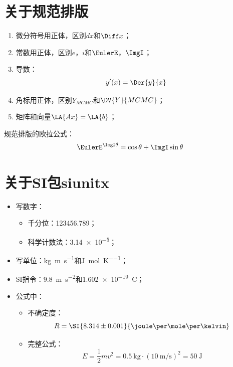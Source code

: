 \section{关于规范排版}

\begin{enumerate}
	\item 微分符号用正体，区别$dx$和$\Diff x$；
	\item 常数用正体，区别$e$，$i$和$\EulerE$，$\ImgI$；
	\item 导数：
	$$
	y'(x) = \Der{y}{x}
	$$
	\item 角标用正体，区别$Y_{MCMC}$和$\DV{Y}{MCMC}$；
	\item 矩阵和向量$\LA{Ax}=\LA{b}$；
\end{enumerate}

\begin{ubox}{规范排版的欧拉公式：}
	\begin{equation}
		\EulerE^{\ImgI\theta} = \cos\theta + \ImgI\sin\theta
	\end{equation}
\end{ubox}

\section{关于SI包siunitx}
\begin{itemize}
	\item 写数字：
	\begin{itemize}
		\item 千分位：\num{123456.789}；
		\item 科学计数法：\num{3.14e-5}；
	\end{itemize}
	
	\item 写单位：\si{\kilogram\metre\per\second}和\si{\joule\per\mole\per\kelvin}；
	
	\item SI指令：\SI{9.8}{\metre\per\second\squared}和\SI{1.602e-19}{\coulomb}；
	
	\item 公式中：
	\begin{itemize}
		\item 不确定度：
		\[
		R = \SI{8.314 \pm 0.001}{\joule\per\mole\per\kelvin}
		\]
		\item 完整公式：
		\[
		E = \frac{1}{2} m v^2 = \SI{0.5}{\kilogram} \cdot \left( \SI{10}{\metre\per\second} \right)^2 = \SI{50}{\joule}
		\]
	\end{itemize}
\end{itemize}

